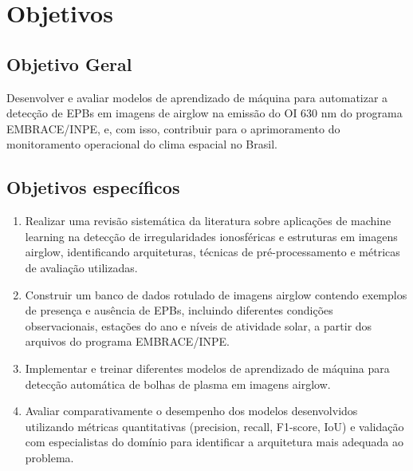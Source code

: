 \chapter{Objetivos}

\section{Objetivo Geral}

Desenvolver e avaliar modelos de aprendizado de máquina para automatizar a detecção de EPBs em imagens de airglow na emissão do OI 630 nm do programa EMBRACE/INPE, e, com isso, contribuir para o aprimoramento do monitoramento operacional do clima espacial no Brasil.

\section{Objetivos específicos}

\begin{enumerate}
\item Realizar uma revisão sistemática da literatura sobre aplicações de machine learning na detecção de irregularidades ionosféricas e estruturas em imagens airglow, identificando arquiteturas, técnicas de pré-processamento e métricas de avaliação utilizadas.

\item Construir um banco de dados rotulado de imagens airglow contendo exemplos de presença e ausência de EPBs, incluindo diferentes condições observacionais, estações do ano e níveis de atividade solar, a partir dos arquivos do programa EMBRACE/INPE.

\item Implementar e treinar diferentes modelos de aprendizado de máquina para detecção automática de bolhas de plasma em imagens airglow.

\item Avaliar comparativamente o desempenho dos modelos desenvolvidos utilizando métricas quantitativas (precision, recall, F1-score, IoU) e validação com especialistas do domínio para identificar a arquitetura mais adequada ao problema.
\end{enumerate}